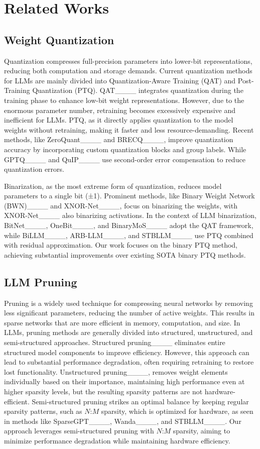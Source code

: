 \section{Related Works}
\subsection{Weight Quantization}
Quantization compresses full-precision parameters into lower-bit representations, reducing both computation and storage demands. Current quantization methods for LLMs are mainly divided into Quantization-Aware Training (QAT) and Post-Training Quantization (PTQ). QAT____ integrates quantization during the training phase to enhance low-bit weight representations. However, due to the enormous parameter number, retraining becomes excessively expensive and inefficient for LLMs. PTQ, as it directly applies quantization to the model weights without retraining, making it faster and less resource-demanding. Recent methods, like ZeroQuant____ and BRECQ____, improve quantization accuracy by incorporating custom quantization blocks and group labels. While GPTQ____ and QuIP____ use second-order error compensation to reduce quantization errors. 

Binarization, as the most extreme form of quantization, reduces model parameters to a single bit (±1). Prominent methods, like Binary Weight Network (BWN)____ and XNOR-Net____, focus on binarizing the weights, with XNOR-Net____ also binarizing activations. In the context of LLM binarization, BitNet____, OneBit____, and BinaryMoS____ adopt the QAT framework, while BiLLM____, ARB-LLM____, and STBLLM____ use PTQ combined with residual approximation. Our work focuses on the binary PTQ method, achieving substantial improvements over existing SOTA binary PTQ methods.
\vspace{1mm}

\subsection{LLM Pruning} 
Pruning is a widely used technique for compressing neural networks by removing less significant parameters, reducing the number of active weights. This results in sparse networks that are more efficient in memory, computation, and size. In LLMs, pruning methods are generally divided into structured, unstructured, and semi-structured approaches. Structured pruning____ eliminates entire structured model components to improve efficiency. However, this approach can lead to substantial performance degradation, often requiring retraining to restore lost functionality. Unstructured pruning____, removes weight elements individually based on their importance, maintaining high performance even at higher sparsity levels, but the resulting sparsity patterns are not hardware-efficient. Semi-structured pruning strikes an optimal balance by keeping regular sparsity patterns, such as $N$:$M$ sparsity, which is optimized for hardware, as seen in methods like SparseGPT____, Wanda____, and STBLLM____. Our approach leverages semi-structured pruning with $N$:$M$ sparsity, aiming to minimize performance degradation while maintaining hardware efficiency.


